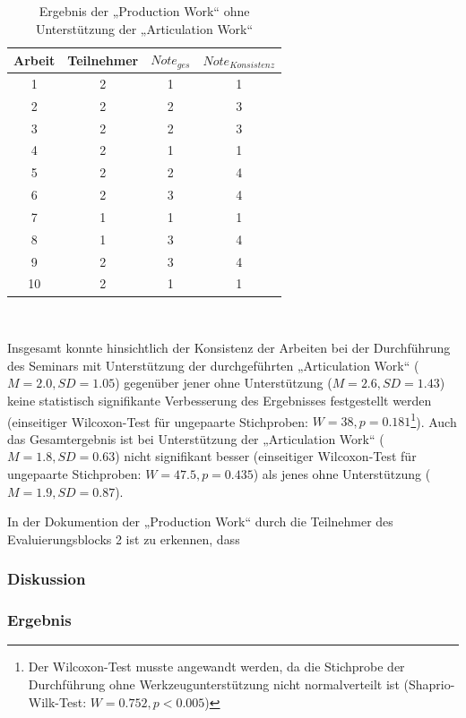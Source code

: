 \begin{table}[htbp]
	\centering
	\caption{Ergebnis der „Production Work“ ohne Unterstützung der „Articulation Work“}

\begin{tabular}{| c || c || c | c |}
  \hline
   Arbeit & Teilnehmer & $Note_{ges}$ & $Note_{Konsistenz}$ \\ \hline
   1         & 2 & 1 & 1 \\ 
   2         & 2 & 2 & 3 \\ 
   3         & 2 & 2 & 3 \\ 
   4         & 2 & 1 & 1 \\ 
   5         & 2 & 2 & 4 \\ 
   6         & 2 & 3 & 4 \\ 
   7         & 1 & 1 & 1 \\ 
   8         & 1 & 3 & 4 \\ 
   9         & 2 & 3 & 4 \\ 
   10        & 2 & 1 & 1 \\ \hline
\end{tabular} \\ 
	\label{tab:ergebnis_ohne}
\end{table}

Insgesamt konnte hinsichtlich der Konsistenz der Arbeiten bei der Durchführung des Seminars mit Unterstützung der durchgeführten „Articulation Work“ ($M=2.0, SD=1.05$) gegenüber jener ohne Unterstützung ($M=2.6, SD=1.43$) keine statistisch signifikante Verbesserung des Ergebnisses festgestellt werden (einseitiger Wilcoxon-Test für ungepaarte Stichproben: $W=38, p=0.181$\footnote{Der Wilcoxon-Test musste angewandt werden, da die Stichprobe der Durchführung ohne Werkzeugunterstützung nicht normalverteilt ist (Shaprio-Wilk-Test: $W=0.752, p<0.005$)}). Auch das Gesamtergebnis ist bei Unterstützung der „Articulation Work“ ($M=1.8, SD=0.63$) nicht signifikant besser (einseitiger Wilcoxon-Test für ungepaarte Stichproben: $W=47.5, p=0.435$) als jenes ohne Unterstützung ($M=1.9, SD=0.87$).

In der Dokumention der „Production Work“ durch die Teilnehmer des Evaluierungsblocks 2 ist zu erkennen, dass 

\subsubsection{Diskussion} 

\subsubsection{Ergebnis} 

